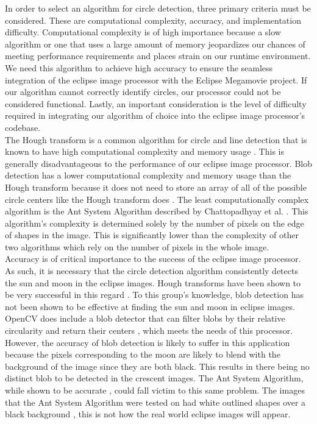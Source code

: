 \documentclass[10pt, onecolumn, draftclsnofoot, letterpaper, compsoc]{IEEEtran}
\begin{document}
In order to select an algorithm for circle detection, three primary criteria
must be considered. These are computational complexity, accuracy, and
implementation difficulty. Computational complexity is of high importance
because a slow algorithm or one that uses a large amount of memory jeopardizes
our chances of meeting performance requirements and places strain on our runtime
environment. We need this algorithm to achieve high accuracy to ensure the
seamless integration of the eclipse image processor with the Eclipse Megamovie
project. If our algorithm cannot correctly identify circles, our processor could
not be considered functional. Lastly, an important consideration is the level of
difficulty required in integrating our algorithm of choice into the eclipse
image processor's codebase. \\


The Hough transform is a common algorithm for circle and line detection that is
known to have high computational complexity and memory usage \cite{hough,
antsystem}. This is generally disadvantageous to the performance of our eclipse
image processor. Blob detection has a lower computational complexity and memory
usage than the Hough transform because it does not need to store an array of all
of the possible circle centers like the Hough transform does \cite{hough,
blobarticle, blobref}. The least computationally complex algorithm is the Ant
System Algorithm described by Chattopadhyay et al. \cite{antsystem}. This
algorithm's complexity is determined solely by the number of pixels on the edge
of shapes in the image. This is significantly lower than the complexity of other
two algorithms which rely on the number of pixels in the whole image. \\


Accuracy is of critical importance to the success of the eclipse image
processor. As such, it is necessary that the circle detection algorithm
consistently detects the sun and moon in the eclipse images. Hough transforms
have been shown to be very successful in this regard \cite{imgKrista}. To this
group's knowledge, blob detection has not been shown to be effective at finding
the sun and moon in eclipse images. OpenCV does include a blob detector that can
filter blobs by their relative circularity and return their centers
\cite{blobarticle, blobref}, which meets the needs of this processor. However,
the accuracy of blob detection is likely to suffer in this application because
the pixels corresponding to the moon are likely to blend with the background of
the image since they are both black. This results in there being no distinct
blob to be detected in the crescent images. The Ant System Algorithm, while
shown to be accurate \cite{antsystem}, could fall victim to this same problem.
The images that the Ant System Algorithm were tested on had white outlined
shapes over a black background \cite{antsystem}, this is not how the real world
eclipse images will appear. \\
\end{document}
